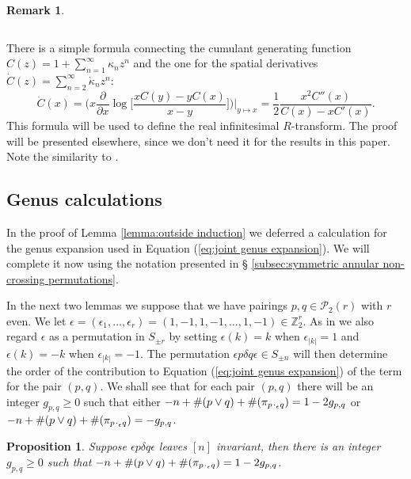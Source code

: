 \documentclass[11pt]{amsart}
\newtheorem{proposition}[theorem]{Proposition}
\theoremstyle{definition}
\newtheorem{remark}[theorem]{Remark}
\numberwithin{theorem}{section}
\newcommand{\bZ}{\mathbb{Z}}
\newcommand{\cP}{\mathcal{P}}
\newcommand{\peq}{{p \mskip 2mu\cdot_\epsilon q}}
\begin{document}
\begin{remark}
\begin{center}
\begin{tabular}{c|l}
\end{tabular}
\end{center}
\endgroup There is a simple formula connecting the cumulant
generating function $C(z) = 1 + \sum_{n=1}^\infty \kappa_n
z^n$ and the one for the spatial derivatives $\dot C(z) =
\sum_{n=2}^\infty \dot \kappa_n z^n$:
\[
\dot C(x) =
\bigg(x  \frac{\partial}{\partial x} \log
\bigg[ \frac{x C(y) - y C(x)}{x - y} \bigg] \bigg) \Bigg\vert_{y \mapsto x}
 = \frac{1}{2} \frac{x^2 C''(x)}{C(x) - x C'(x)}.
\]
This formula will be used to define the real infinitesimal
$R$-transform. The proof will be presented elsewhere, since
we don't need it for the results in this paper. Note the
similarity to \cite[Eq.~(51)]{cmss}.
\end{remark}


\subsection{Genus calculations}\label{subsec:genus calculations}

In the proof of Lemma \ref{lemma:outside induction} we
deferred a calculation for the genus expansion used in
Equation (\ref{eq:joint genus expansion}). We will complete
it now using the notation presented in \S
\ref{subsec:symmetric annular non-crossing permutations}.

In the next two lemmas we suppose that we have pairings $p,
q \in \cP_2(r)$ with $r$ even. We let $\epsilon =
(\epsilon_1, \dots, \epsilon_r) = (1, -1, 1, -1, \dots, 1,
-1) \in \bZ_2^r$. As in \cite[\S3 p. 995]{m} we also regard
$\epsilon$ as a permutation in $S_{\pm r}$ by setting
$\epsilon( k) = k$ when $\epsilon_{|k|} = 1$ and $\epsilon(
k) = - k$ when $\epsilon_{|k|} = -1$. The permutation
$\epsilon p \delta q \epsilon \in S_{\pm n}$ will then
determine the order of the contribution to Equation
(\ref{eq:joint genus expansion}) of the term for the pair
$(p, q)$. We shall see that for each pair $(p, q)$ there
will be an integer $g_{p,q} \geq 0$ such that either $-n +
\#(p \vee q) + \#(\pi_\peq) = 1 -2 g_{p,q}$ or $-n + \#(p
\vee q) + \#(\pi_\peq) = - g_{p,q}$.



\begin{proposition}\label{prop:disconnected genus}
Suppose $\epsilon p \delta q \epsilon$ leaves $[n]$
invariant, then there is an integer $g_{p,q} \geq 0$ such
that $-n + \#(p \vee q) + \#(\pi_\peq) = 1 -2 g_{p,q}$.
\end{proposition}
\end{document}

